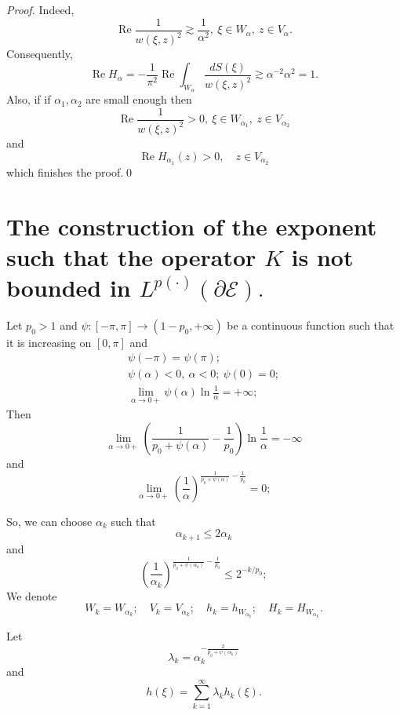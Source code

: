 \documentclass[review]{elsarticle}
\newcommand{\RE}{ \mathop{\mathrm{Re}} }
\begin{document}
\begin{proof}
	Indeed,
	$$\RE \frac{1}{w(\xi,z)^2} \gtrsim \frac{1}{\alpha^2},\ \xi\in W_\alpha,\ z\in V_\alpha.$$
	Consequently,
	$$ \RE{H_\alpha} = -\frac{1}{\pi^2} \RE \int_{W_\alpha} \frac{ dS(\xi) }{w(\xi,z)^2} \gtrsim \alpha^{-2}\alpha^{2} = 1.$$
	Also, if if $\alpha_1,\alpha_2$ are small enough then
	$$\RE \frac{1}{w(\xi,z)^2} > 0,\ \xi\in W_{\alpha_1},\ z\in V_{\alpha_2}$$
	and
	$$ 
	\RE{H_{\alpha_1}(z)} > 0,\quad z\in V_{\alpha_2}
	$$	
	which finishes the proof.\qed
\end{proof}

\section{The construction of the exponent such that the operator $K$ is not bounded in  $L^{p(\cdot)}(\partial \mathcal{E}).$}

Let $p_0>1$ and $\psi:[-\pi,\pi]\to(1-p_0,+\infty)$ be a continuous function such that it is increasing on $[0,\pi]$ and
\begin{eqnarray}
	\psi(-\pi)=\psi(\pi);\label{eq:exp1}\\ 
	\psi(\alpha)<0,\ \alpha<0;\ \psi(0)=0;\label{eq:exp2}\\
	\lim_{\alpha\to0+}\psi(\alpha)\ln\frac{1}{\alpha} = +\infty;\label{eq:exp3}
\end{eqnarray}
Then 
\begin{equation}
	\lim_{\alpha\to0+}\left(\frac{1}{p_0+\psi(\alpha)} - \frac{1}{p_0}\right) \ln\frac{1}{\alpha} = -\infty
\end{equation}
and
\begin{equation}
	\lim_{\alpha\to0+} \left(\frac{1}{\alpha} \right)^{\frac{1}{p_0+\psi(\alpha)} - \frac{1}{p_0}} = 0;
\end{equation}

So, we can choose $\alpha_k$ such that
\begin{equation} \label{eq:alpha_k:1}
	\alpha_{k+1}\leq 2\alpha_k
\end{equation}
and
\begin{equation}\label{eq:alpha_k:2}
	 \left( \frac{1}{\alpha_k} \right)^{ \frac{1}{p_0+\psi(\alpha_k)}-\frac{1}{p_0} } \leq 2^{-k/p_0};
\end{equation}
We denote 
$$W_k=W_{\alpha_k};\quad V_k=V_{\alpha_k};\quad
h_k=h_{W_{\alpha_k}};\quad H_k=H_{W_{\alpha_k}}.$$

Let 
$$\lambda_k= \alpha_{k}^{-\frac{2}{p_0+\psi(\alpha_{k})}}$$
and
$$h(\xi) = \sum\limits_{k=1}^\infty \lambda_k h_k(\xi).$$
\end{document}
